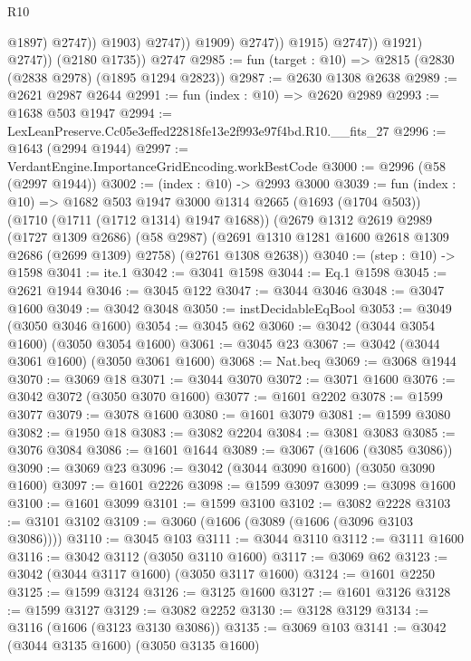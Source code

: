 \begin{lexlean}{R10}
\begin{coremodule}
                                    @1897)
                                  @2747))
                              @1903)
                            @2747))
                        @1909)
                      @2747))
                  @1915)
                @2747))
            @1921)
          @2747))
      (@2180 @1735))
    @2747
@2985 := fun (target : @10) => @2815 (@2830 (@2838 @2978) (@1895 @1294 @2823))
@2987 := @2630 @1308 @2638
@2989 := @2621 @2987 @2644
@2991 := fun (index : @10) => @2620 @2989
@2993 := @1638 @503 @1947
@2994 := LexLeanPreserve.Cc05e3effed22818fe13e2f993e97f4bd.R10.__fits_27
@2996 := @1643 (@2994 @1944)
@2997 := VerdantEngine.ImportanceGridEncoding.workBestCode
@3000 := @2996 (@58 (@2997 @1944))
@3002 := (index : @10) -> @2993 @3000
@3039 := fun (index : @10) =>
  @1682
    @503
    @1947
    @3000
    @1314
    @2665
    (@1693 (@1704 @503))
    (@1710 (@1711 (@1712 @1314) @1947 @1688))
    (@2679
      @1312
      @2619
      @2989
      (@1727 @1309 @2686)
      (@58 @2987)
      (@2691 @1310 @1281 @1600 @2618 @1309 @2686 (@2699 @1309) @2758)
      (@2761 @1308 @2638))
@3040 := (step : @10) -> @1598
@3041 := ite.{1}
@3042 := @3041 @1598
@3044 := Eq.{1} @1598
@3045 := @2621 @1944
@3046 := @3045 @122
@3047 := @3044 @3046
@3048 := @3047 @1600
@3049 := @3042 @3048
@3050 := instDecidableEqBool
@3053 := @3049 (@3050 @3046 @1600)
@3054 := @3045 @62
@3060 := @3042 (@3044 @3054 @1600) (@3050 @3054 @1600)
@3061 := @3045 @23
@3067 := @3042 (@3044 @3061 @1600) (@3050 @3061 @1600)
@3068 := Nat.beq
@3069 := @3068 @1944
@3070 := @3069 @18
@3071 := @3044 @3070
@3072 := @3071 @1600
@3076 := @3042 @3072 (@3050 @3070 @1600)
@3077 := @1601 @2202
@3078 := @1599 @3077
@3079 := @3078 @1600
@3080 := @1601 @3079
@3081 := @1599 @3080
@3082 := @1950 @18
@3083 := @3082 @2204
@3084 := @3081 @3083
@3085 := @3076 @3084
@3086 := @1601 @1644
@3089 := @3067 (@1606 (@3085 @3086))
@3090 := @3069 @23
@3096 := @3042 (@3044 @3090 @1600) (@3050 @3090 @1600)
@3097 := @1601 @2226
@3098 := @1599 @3097
@3099 := @3098 @1600
@3100 := @1601 @3099
@3101 := @1599 @3100
@3102 := @3082 @2228
@3103 := @3101 @3102
@3109 := @3060 (@1606 (@3089 (@1606 (@3096 @3103 @3086))))
@3110 := @3045 @103
@3111 := @3044 @3110
@3112 := @3111 @1600
@3116 := @3042 @3112 (@3050 @3110 @1600)
@3117 := @3069 @62
@3123 := @3042 (@3044 @3117 @1600) (@3050 @3117 @1600)
@3124 := @1601 @2250
@3125 := @1599 @3124
@3126 := @3125 @1600
@3127 := @1601 @3126
@3128 := @1599 @3127
@3129 := @3082 @2252
@3130 := @3128 @3129
@3134 := @3116 (@1606 (@3123 @3130 @3086))
@3135 := @3069 @103
@3141 := @3042 (@3044 @3135 @1600) (@3050 @3135 @1600)

\end{coremodule}
\end{lexlean}
